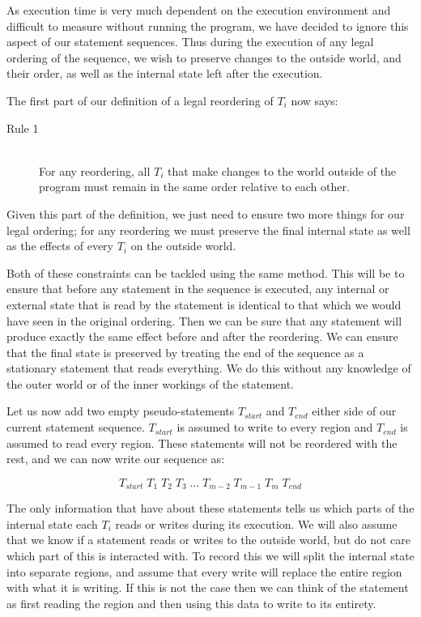 \documentclass{report}
\begin{document}
As execution time is very much dependent on the execution environment and difficult to measure without running the program, we have decided to ignore this aspect
of our statement sequences. Thus during the execution of any legal ordering of the sequence, we wish to preserve changes to the outside world, and their order,
as well as the internal state left after the execution.

The first part of our definition of a legal reordering of $T_i$ now says:

\begin{description}
\item[Rule 1] \hfill \\
For any reordering, all $T_i$ that make changes to the world outside of the program must remain in the same order relative to each other.
\end{description}

Given this part of the definition, we just need to ensure two more things for our legal ordering; for any reordering we must preserve the final internal
state as well as the effects of every $T_i$ on the outside world.

Both of these constraints can be tackled using the same method. This will be to ensure that before any statement in the sequence is executed, any internal
or external state that is read by the statement is identical to that which we would have seen in the original ordering. Then we can be sure that any statement
will produce exactly the same effect before and after the reordering. We can ensure that the final state is preserved by treating the end of the sequence as
a stationary statement that reads everything. We do this without any knowledge of the outer world or of the inner workings of the statement.

Let us now add two empty pseudo-statements $T_{start}$ and $T_{end}$ either side of our current statement sequence. $T_{start}$ is assumed to write to every
region and $T_{end}$ is assumed to read every region. These statements will not be reordered with the rest, and we can now write our sequence as:

$$T_{start} \; T_1 \; T_2 \; T_3 \; \ldots \; T_{m-2} \; T_{m-1} \; T_m \; T_{end}$$

The only information that have about these statements tells us which parts of the internal state each $T_i$ reads or writes during its execution. We will
also assume that we know if a statement reads or writes to the outside world, but do not care which part of this is interacted with. To record this we
will split the internal state into separate regions, and assume that every write will replace the entire region with what it is writing. If this is not
the case then we can think of the statement as first reading the region and then using this data to write to its entirety.
\end{document}
